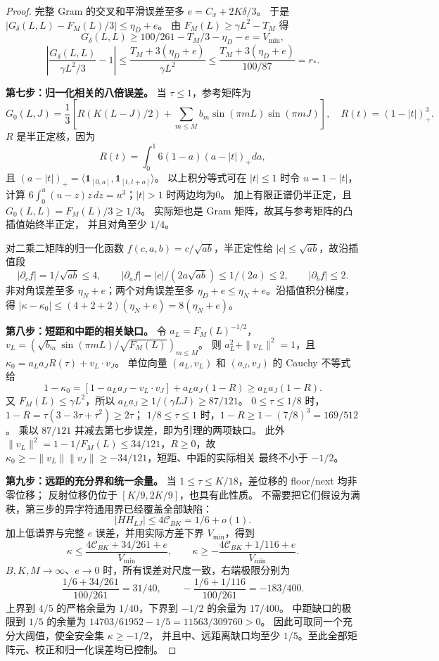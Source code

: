 \documentclass[UTF8,a4paper,11pt,fontset=fandol]{ctexart}
\theoremstyle{remark}
\begin{document}
\begin{proof}
完整 Gram 的交叉和平滑误差至多 $e=C_x+2K\delta/3$。
于是 $|G_\delta(L,L)-F_M(L)/3|\le\eta_D+e$。
由 $F_M(L)\ge\gamma L^2-T_M$ 得
\[
 G_\delta(L,L)\ge100/261-T_M/3-\eta_D-e=V_{\min},
\]
\[
 \left|\frac{G_\delta(L,L)}{\gamma L^2/3}-1\right|
 \le\frac{T_M+3(\eta_D+e)}{\gamma L^2}
 \le\frac{T_M+3(\eta_D+e)}{100/87}=r_*.
\]

\textbf{第七步：归一化相关的八倍误差。}
当 $\tau\le1$，参考矩阵为
\[
 G_0(L,J)=\frac13\left[R(K(L-J)/2)
 +\sum_{m\le M}b_m\sin(\pi mL)\sin(\pi mJ)\right],
 \quad R(t)=(1-|t|)_+^3.
\]
$R$ 是半正定核，因为
\[
 R(t)=\int_0^1 6(1-a)(a-|t|)_+da,
\]
且 $(a-|t|)_+=\langle\mathbf1_{[0,a]},\mathbf1_{[t,t+a]}\rangle$。
以上积分等式可在 $|t|\le1$ 时令 $u=1-|t|$，计算
$6\int_0^u(u-z)z\,dz=u^3$；$|t|>1$ 时两边均为0。
加上有限正谱仍半正定，且 $G_0(L,L)=F_M(L)/3\ge1/3$。
实际矩也是 Gram 矩阵，故其与参考矩阵的凸插值始终半正定，
并且对角至少 $1/4$。

对二乘二矩阵的归一化函数 $f(c,a,b)=c/\sqrt{ab}$，半正定性给
$|c|\le\sqrt{ab}$，故沿插值段
\[
 |\partial_cf|=1/\sqrt{ab}\le4,\qquad
 |\partial_af|=|c|/(2a\sqrt{ab})\le1/(2a)\le2,
 \qquad|\partial_bf|\le2.
\]
非对角误差至多 $\eta_N+e$；两个对角误差至多
$\eta_D+e\le\eta_N+e$。沿插值积分梯度，得
$|\kappa-\kappa_0|\le(4+2+2)(\eta_N+e)=8(\eta_N+e)$。

\textbf{第八步：短距和中距的相关缺口。}
令 $a_L=F_M(L)^{-1/2}$，
$v_L=(\sqrt{b_m}\sin(\pi mL)/\sqrt{F_M(L)})_{m\le M}$。
则 $a_L^2+\|v_L\|^2=1$，且
$\kappa_0=a_La_JR(\tau)+v_L\cdot v_J$。
单位向量 $(a_L,v_L)$ 和 $(a_J,v_J)$ 的 Cauchy 不等式给
\[
 1-\kappa_0=[1-a_La_J-v_L\cdot v_J]+a_La_J(1-R)
 \ge a_La_J(1-R).
\]
又 $F_M(L)\le\gamma L^2$，所以
$a_La_J\ge1/(\gamma LJ)\ge87/121$。
$0\le\tau\le1/8$ 时，
$1-R=\tau(3-3\tau+\tau^2)\ge2\tau$；
$1/8\le\tau\le1$ 时，$1-R\ge1-(7/8)^3=169/512$。
乘以 $87/121$ 并减去第七步误差，即为引理的两项缺口。
此外 $\|v_L\|^2=1-1/F_M(L)\le34/121$，$R\ge0$，故
$\kappa_0\ge-\|v_L\|\|v_J\|\ge-34/121$，短距、中距的实际相关
最终不小于 $-1/2$。

\textbf{第九步：远距的充分界和统一余量。}
当 $1\le\tau\le K/18$，差位移的 floor/next 均非零位移；
反射位移仍位于 $[K/9,2K/9]$，也具有此性质。
不需要把它们假设为满秩，第三步的异字符通用界已经覆盖全部缺陷：
\[
 |HH_{LJ}|\le4\mathcal C_{BK}=1/6+o(1).
\]
加上低谱界与完整 $e$ 误差，并用实际方差下界 $V_{\min}$，得到
\[
 \kappa\le\frac{4\mathcal C_{BK}+34/261+e}{V_{\min}},
 \qquad\kappa\ge-\frac{4\mathcal C_{BK}+1/116+e}{V_{\min}}.
\]
$B,K,M\to\infty$、$e\to0$ 时，所有误差对尺度一致，右端极限分别为
\[
 \frac{1/6+34/261}{100/261}=31/40,
 \qquad-\frac{1/6+1/116}{100/261}=-183/400.
\]
上界到 $4/5$ 的严格余量为 $1/40$，下界到 $-1/2$ 的余量为 $17/400$。
中距缺口的极限到 $1/5$ 的余量为
$14703/61952-1/5=11563/309760>0$。
因此可取同一个充分大阈值，使全安全集 $\kappa\ge-1/2$，
并且中、远距离缺口均至少 $1/5$。至此全部矩阵元、校正和归一化误差均已控制。
\end{proof}
\end{document}
